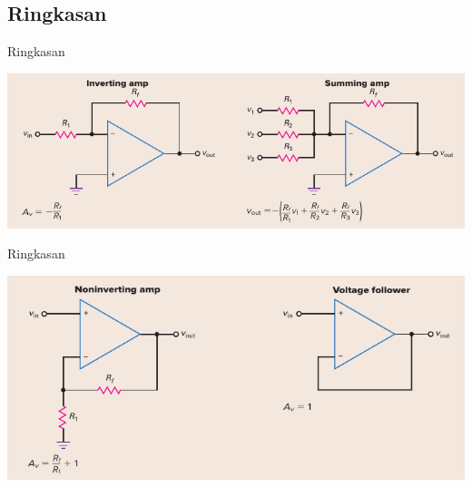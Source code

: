 \subsection{Ringkasan}
\begin{frame}{Ringkasan}
	\begin{center}
		\includegraphics[width=\linewidth]{gambar/table-16.2a}
	\end{center}
\end{frame}

\begin{frame}{Ringkasan}
	\begin{center}
		\includegraphics[width=\linewidth]{gambar/table-16.2b}
	\end{center}
\end{frame}